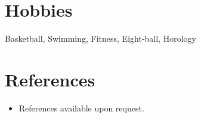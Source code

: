 \documentclass[letterpaper,11pt]{article}
\makeatletter
\newcommand{\resumeOrganizationHeading}[4]{
  \vspace{-2pt}\item
    \begin{tabular*}{0.97\textwidth}[t]{l@{\extracolsep{\fill}}r}
      \textbf{#1} & \textit{\small #2} \\
      \textit{\small#3}
    \end{tabular*}\vspace{-7pt}
}
\newcommand{\resumeSubHeadingListStart}{\begin{itemize}[leftmargin=0.15in, label={}]}
\newcommand{\resumeSubHeadingListEnd}{\end{itemize}}
\makeatother
\begin{document}


\section{Hobbies}
  \resumeSubHeadingListStart
    \small{\item{Basketball, Swimming, Fitness, Eight-ball, Horology}}
  \resumeSubHeadingListEnd

\section{References}
  \vspace{2pt}
  \resumeSubHeadingListStart
    \item{References available upon request.}
  \resumeSubHeadingListEnd

\end{document}
